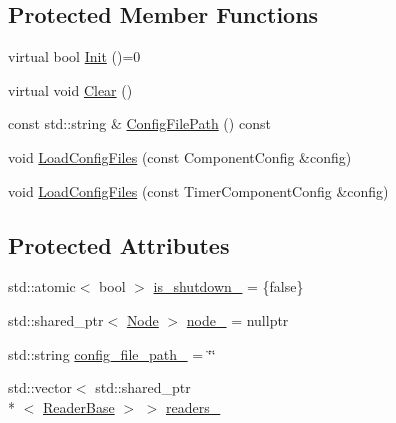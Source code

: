 \subsection*{Protected Member Functions}
\begin{DoxyCompactItemize}
\item 
virtual bool \hyperlink{classapollo_1_1cyber_1_1ComponentBase_ae9901cb3bfa8ef33c42b465606dbe0e5}{Init} ()=0
\item 
virtual void \hyperlink{classapollo_1_1cyber_1_1ComponentBase_a05394f4bc5c70604f45a9194b1948aa4}{Clear} ()
\item 
const std\-::string \& \hyperlink{classapollo_1_1cyber_1_1ComponentBase_a77aaf08fe82edd39034868519d5be4cc}{Config\-File\-Path} () const 
\item 
void \hyperlink{classapollo_1_1cyber_1_1ComponentBase_afc6983393f7b411e673b09edd90e1643}{Load\-Config\-Files} (const Component\-Config \&config)
\item 
void \hyperlink{classapollo_1_1cyber_1_1ComponentBase_aa6e7e5f9294f87bb5ff8c859ed1def27}{Load\-Config\-Files} (const Timer\-Component\-Config \&config)
\end{DoxyCompactItemize}
\subsection*{Protected Attributes}
\begin{DoxyCompactItemize}
\item 
std\-::atomic$<$ bool $>$ \hyperlink{classapollo_1_1cyber_1_1ComponentBase_a8e11428c0f4b5566ac3a602cef96516c}{is\-\_\-shutdown\-\_\-} = \{false\}
\item 
std\-::shared\-\_\-ptr$<$ \hyperlink{classapollo_1_1cyber_1_1Node}{Node} $>$ \hyperlink{classapollo_1_1cyber_1_1ComponentBase_ae561da7f75d403c45eca1ff3d0cfe2c8}{node\-\_\-} = nullptr
\item 
std\-::string \hyperlink{classapollo_1_1cyber_1_1ComponentBase_afb307772b21999bdb29e2ec866acfc75}{config\-\_\-file\-\_\-path\-\_\-} = \char`\"{}\char`\"{}
\item 
std\-::vector$<$ std\-::shared\-\_\-ptr\\*
$<$ \hyperlink{classapollo_1_1cyber_1_1ReaderBase}{Reader\-Base} $>$ $>$ \hyperlink{classapollo_1_1cyber_1_1ComponentBase_a381445ac2102bd1a34dbf87fef480919}{readers\-\_\-}
\end{DoxyCompactItemize}


